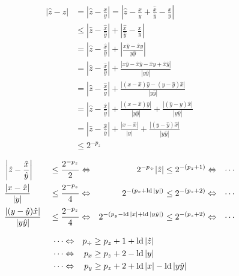 \begin{equation*}
\begin{split}
  |\hat{z}-z| & =  |\hat{z}-\frac{x}{y}| 
                =  \left|\hat{z}-\frac{\hat{x}}{\hat{y}}
			    +  \frac{\hat{x}}{\hat{y}}-\frac{x}{y}\right| \\
              &\le \left|\hat{z}-\frac{\hat{x}}{\hat{y}}\right|
			    +  \left|\frac{\hat{x}}{\hat{y}}-\frac{x}{y}\right| \\
              & =  \left|\hat{z}-\frac{\hat{x}}{\hat{y}}\right|
			    +  \left|\frac{x\hat{y}-\hat{x}y}{y\hat{y}}\right| \\
              & =  \left|\hat{z}-\frac{\hat{x}}{\hat{y}}\right|
			    +  \frac{|x\hat{y}-\hat{x}\hat{y}-\hat{x}y+\hat{x}\hat{y}|}{|y\hat{y}|} \\
              & =  \left|\hat{z}-\frac{\hat{x}}{\hat{y}}\right|
			    +  \frac{|(x-\hat{x})\hat{y}-(y-\hat{y})\hat{x}|}{|y\hat{y}|} \\
              & =  \left|\hat{z}-\frac{\hat{x}}{\hat{y}}\right|
			    +  \frac{|(x-\hat{x})\hat{y}|}{|y\hat{y}|}
			    +  \frac{|(\hat{y}-y)\hat{x}|}{|y\hat{y}|} \\
              & =  \left|\hat{z}-\frac{\hat{x}}{\hat{y}}\right|
			    +  \frac{|x-\hat{x}|}{|y|}
			    +  \frac{|(y-\hat{y})\hat{x}|}{|y\hat{y}|} \\
              &\le 2^{-p_z}
\end{split}
\end{equation*}

\begin{equation*}
\begin{split}
 & \left|\hat{z}-\frac{\hat{x}}{\hat{y}}\right|&&\le\frac{2^{-p_z}}{2}
   \Leftrightarrow &
   2^{-p_\div}|\hat{z}|&\le 2^{-(p_z+1)}
   \Leftrightarrow &
   \cdots
   \\
 & \frac{|x-\hat{x}|}{|y|}&&\le\frac{2^{-p_z}}{4}
   \Leftrightarrow &
   2^{-(p_x+\mathop{\rm ld}\nolimits|y|)}&\le 2^{-(p_z+2)}
   \Leftrightarrow &
   \cdots
   \\
 & \frac{|(y-\hat{y})\hat{x}|}{|y\hat{y}|}&&\le\frac{2^{-p_z}}{4}
   \Leftrightarrow &
   2^{-(p_y-\mathop{\rm ld}\nolimits|x|+\mathop{\rm ld}\nolimits|y\hat{y}|)}&\le 2^{-(p_z+2)}
   \Leftrightarrow &
   \cdots
   \\
\end{split}
\end{equation*}

\begin{equation*}
\begin{split}
   &
   \cdots
   \Leftrightarrow &
   p_\div  &\ge p_z+1+\mathop{\rm ld}\nolimits|\hat{z}|
   \\
   &
   \cdots
   \Leftrightarrow &
   p_x  &\ge p_z+2-\mathop{\rm ld}\nolimits|y|
   \\
   &
   \cdots
   \Leftrightarrow &
   p_y  &\ge p_z+2+\mathop{\rm ld}\nolimits|x|-\mathop{\rm ld}\nolimits|y\hat{y}|
   \\
\end{split}
\end{equation*}


